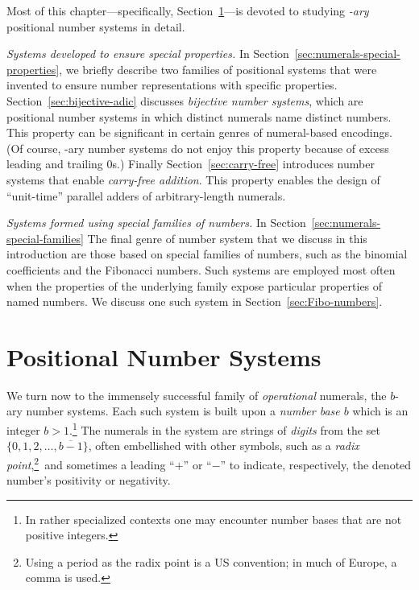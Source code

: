 \smallskip

\noindent
Most of this chapter---specifically,
Section~\ref{sec:positional-numbers}---is devoted to studying {\em
  -ary} positional number systems in detail.

\medskip

\noindent
{\it Systems developed to ensure special properties.}
In Section~\ref{sec:numerals-special-properties}, we briefly describe
two families of positional systems that were invented to ensure number
representations with specific properties.  Section~\ref{sec:bijective-adic}
discusses {\em bijective number systems},
which are positional number systems in which distinct numerals name
distinct numbers.  This property can be significant in certain genres
of numeral-based encodings.  (Of course, -ary number systems do not
enjoy this property because of excess leading and trailing $0$s.)
Finally Section~\ref{sec:carry-free} introduces number systems that
enable {\em carry-free addition}.  This property enables the design of
``unit-time'' parallel adders of arbitrary-length numerals.

\medskip

\noindent
{\it Systems formed using special families of numbers.}
%
In Section~\ref{sec:numerals-special-families}
The final genre of number system that we discuss in this introduction
are those based on special families of numbers, such as the binomial
coefficients and the Fibonacci numbers.  Such systems are employed
most often when the properties of the underlying family expose
particular properties of named numbers.  We discuss one such system in
Section~\ref{sec:Fibo-numbers}.


\section{Positional Number Systems}
\label{sec:positional-numbers}

We turn now to the immensely successful family of {\em operational}
numerals, the $b$-ary number systems.  Each such system is built upon
a {\em number base $b$} which is an integer $b> 1$.\footnote{In
  rather specialized contexts one may encounter number bases that are
  not positive integers.}
The numerals in the system are strings of {\it digits} from the set
$\{0, 1, 2, \ldots, \overline{b-1}\}$, often embellished with other
symbols, such as a {\em radix point},\footnote{Using a period as the
  radix point is a US convention; in much of Europe, a comma is
  used.}~and sometimes a leading ``$+$'' or ``$-$'' to indicate,
respectively, the denoted number's positivity or negativity.

